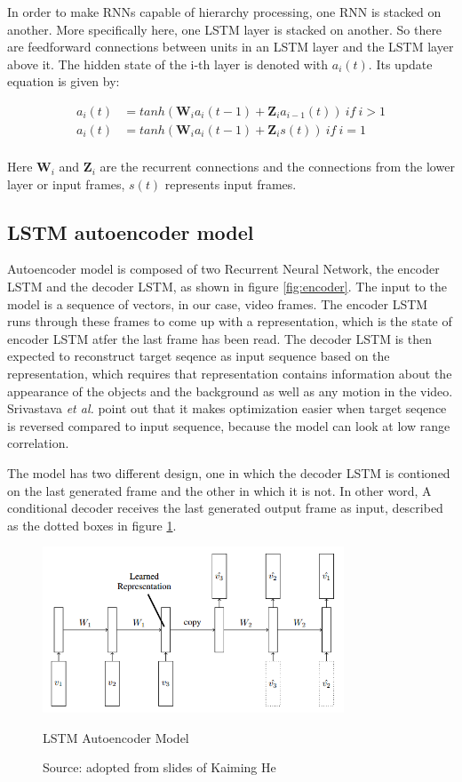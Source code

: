 \documentclass[twoside,a4paper,article]{combine}
\begin{document}
In order to make RNNs capable of hierarchy processing, one RNN is stacked on another. More specifically here, one LSTM layer is stacked on
another. So there are feedforward connections between units in an LSTM layer and the LSTM layer above it. The hidden state of the i-th
layer is denoted with $a_i(t)$. Its update equation is given by:

\begin{align*}
    a_i(t) &= tanh(\mathbf{W}_{i}a_i(t-1) + \mathbf{Z}_{i}a_{i-1}(t)) \ if \ i > 1 \\
    a_i(t) &= tanh(\mathbf{W}_{i}a_i(t-1) + \mathbf{Z}_{i}s(t)) \ if \ i = 1 \\
\end{align*}

Here $\mathbf{W}_i$ and $\mathbf{Z}_i$ are the recurrent connections and the connections from the lower layer or input frames, $s(t)$
represents input frames.



\subsection{LSTM autoencoder model}
Autoencoder model is composed of two Recurrent Neural Network, the encoder LSTM and the decoder LSTM, as shown in figure \ref{fig:encoder}.
The input to the model is a sequence of vectors, in our case, video frames. The encoder LSTM runs through these frames to come up with a
representation, which is the state of encoder LSTM atfer the last frame has been read. The decoder LSTM is then expected to reconstruct
target seqence as input sequence based on the representation, which requires that representation contains information about the
appearance of the objects and the background as well as any motion in the video. Srivastava \emph{et al.} point out that it makes
optimization easier when target seqence is reversed compared to input sequence, because the model can look at low range correlation. 

The model has two different design, one in which the decoder LSTM is contioned on the last generated frame and the other in which it is
not. In other word, A conditional decoder receives the last generated output frame as input, described as the dotted boxes in figure 
\ref{fig:autoencoder}.

\begin{figure}[h!]
    \includegraphics[width=0.8\textwidth]{autoencoder}
    \caption{LSTM Autoencoder Model}
    \caption*{Source: adopted from slides of Kaiming He}
    \label{fig:autoencoder}
\end{figure}
\end{document}
